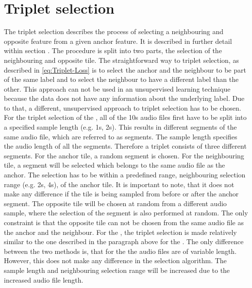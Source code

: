 \section{Triplet selection}
\label{sec:Triplet-Selection}
The triplet selection describes the process of selecting a neighbouring and opposite feature from a given anchor feature. It is described in further detail within section . The procedure is split into two parts, the selection of the neighbouring and opposite tile.
\newline
\newline
The straightforward way to triplet selection, as described in \ref{eq:Triplet-Loss} is to select the anchor and the neighbour to be part of the same label and to select the neighbour to have a different label than the other. This approach can not be used in an unsupervised learning technique because the data does not have any information about the underlying label. Due to that, a different, unsupervised approach to triplet selection has to be chosen.
\newline
\newline
For the triplet selection of the , all of the 10s audio files first have to be split into a specified sample length (e.g. 1s, 2s). This results in different segments of the same audio file, which are referred to as segments. The sample length specifies the audio length of all the segments. Therefore a triplet consists of three different segments.
\newline
For the anchor tile, a random segment is chosen. For the neighbouring tile, a segment will be selected which belongs to the same audio file as the anchor. The selection has to be within a predefined range, neighbouring selection range (e.g. 2s, 4s), of the anchor tile. It is important to note, that it does not make any difference if the tile is being sampled from before or after the anchor segment. The opposite tile will be chosen at random from a different audio sample, where the selection of the segment is also performed at random. The only constraint is that the opposite tile can not be chosen from the same audio file as the anchor and the neighbour.
\newline
\newline
For the , the triplet selection is made relatively similar to the one described in the paragraph above for the . The only difference between the two methods is, that for the  the audio files are of variable length. However, this does not make any difference in the selection algorithm. The sample length and neighbouring selection range will be increased due to the increased audio file length.

